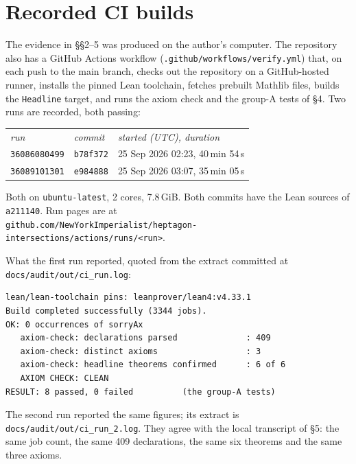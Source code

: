 \documentclass[11pt]{article}
\newcommand{\code}[1]{\texttt{\small #1}}
\newenvironment{trustbox}%
  {\par\medskip\setlength{\fboxsep}{9pt}%
   \begin{lrbox}{\trustboxbuf}%
   \begin{minipage}{\dimexpr\textwidth-2\fboxsep-2\fboxrule\relax}}%
  {\end{minipage}\end{lrbox}%
   \noindent\fcolorbox{black!35}{black!4}{\usebox{\trustboxbuf}}\par\medskip}
\begin{document}
\section{Recorded CI builds}\label{sec:ci}

The evidence in \S\S2--5 was produced on the author's computer. The repository
also has a GitHub Actions workflow (\code{.github/workflows/verify.yml}) that,
on each push to the main branch, checks out the repository on a
GitHub-hosted runner, installs the pinned Lean toolchain, fetches prebuilt
Mathlib files, builds the \code{Headline} target, and runs the axiom check
and the group-A tests of \S4. Two runs are recorded, both passing:

\begin{trustbox}
\small
\begin{tabular}{@{}lll@{}}
\textit{run} & \textit{commit} & \textit{started (UTC), duration}\\[2pt]
\code{36086080499} & \code{b78f372} & 25 Sep 2026 02:23, 40\,min 54\,s\\
\code{36089101301} & \code{e984888} & 25 Sep 2026 03:07, 35\,min 05\,s
\end{tabular}

\smallskip
{\footnotesize Both on \code{ubuntu-latest}, 2 cores, 7.8\,GiB. Both commits
have the Lean sources of \code{a211140}. Run pages are at\\
\texttt{github.com/NewYorkImperialist/heptagon-intersections/actions/runs/<run>}.}
\end{trustbox}

\noindent What the first run reported, quoted from the extract committed at
\code{docs/audit/out/ci\_run.log}:

\begin{trustbox}
\begin{Verbatim}[fontsize=\small]
lean/lean-toolchain pins: leanprover/lean4:v4.33.1
Build completed successfully (3344 jobs).
OK: 0 occurrences of sorryAx
   axiom-check: declarations parsed              : 409
   axiom-check: distinct axioms                  : 3
   axiom-check: headline theorems confirmed      : 6 of 6
   AXIOM CHECK: CLEAN
RESULT: 8 passed, 0 failed          (the group-A tests)
\end{Verbatim}
\end{trustbox}

\noindent The second run reported the same figures; its extract is
\code{docs/audit/out/ci\_run\_2.log}. They agree with the local transcript of
\S5: the same job count, the same 409 declarations, the same six theorems and
the same three axioms.
\end{document}
